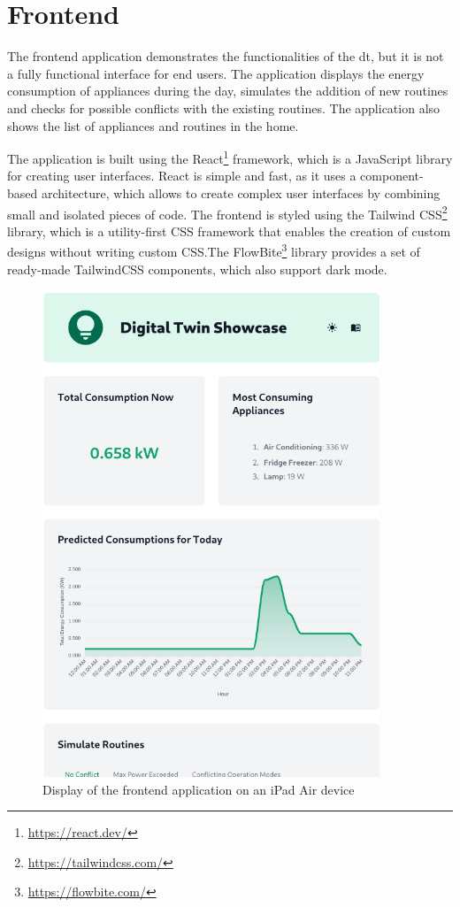\section{Frontend}

The frontend application demonstrates the functionalities of the \acrshort{dt}, but it is not a fully functional interface for end users. The application displays the energy consumption of appliances during the day, simulates the addition of new routines and checks for possible conflicts with the existing routines. The application also shows the list of appliances and routines in the home.

The application is built using the React\footnote{\url{https://react.dev/}} framework, which is a JavaScript library for creating user interfaces. React is simple and fast, as it uses a component-based architecture, which allows to create complex user interfaces by combining small and isolated pieces of code. The frontend is styled using the Tailwind CSS\footnote{\url{https://tailwindcss.com/}} library, which is a utility-first CSS framework that enables the creation of custom designs without writing custom CSS.\@ The FlowBite\footnote{\url{https://flowbite.com/}} library provides a set of ready-made TailwindCSS components, which also support dark mode.

\begin{figure}
    \centering
    \includegraphics[width=0.9\textwidth]{images/frontend/responsive.png}
    \caption{Display of the frontend application on an iPad Air device}%
    \label{fig:frontend_responsive}
\end{figure}

